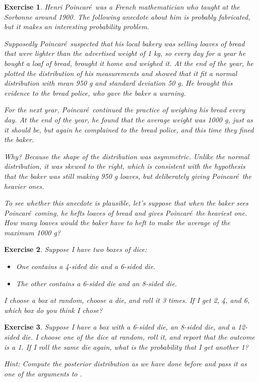 \documentclass[12pt]{book}
\theoremstyle{exercise}
\newtheorem{exercise}{Exercise}[chapter]
\begin{document}
\newcommand{\Poincare}{Poincar\'{e}}

\begin{exercise}
Henri \Poincare~was a French mathematician who taught at the Sorbonne around 1900. The following anecdote about him is probably fabricated, but it makes an interesting probability problem.

Supposedly \Poincare~suspected that his local bakery was selling loaves of bread that were lighter than the advertised weight of 1 kg, so every day for a year he bought a loaf of bread, brought it home and weighed it. At the end of the year, he plotted the distribution of his measurements and showed that it fit a normal distribution with mean 950 g and standard deviation 50 g. He brought this evidence to the bread police, who gave the baker a warning.

For the next year, \Poincare~continued the practice of weighing his bread every day. At the end of the year, he found that the average weight was 1000 g, just as it should be, but again he complained to the bread police, and this time they fined the baker.

Why? Because the shape of the distribution was asymmetric. Unlike the normal distribution, it was skewed to the right, which is consistent with the hypothesis that the baker was still making 950 g loaves, but deliberately giving \Poincare~the heavier ones.

To see whether this anecdote is plausible, let's suppose that when the baker sees \Poincare~coming, he hefts  loaves of bread and gives \Poincare~the heaviest one.  How many loaves would the baker have to heft to make the average of the maximum 1000 g?
\end{exercise}


\begin{exercise}
Suppose I have two boxes of dice:

\begin{itemize}
\item One contains a 4-sided die and a 6-sided die.

\item The other contains a 6-sided die and an 8-sided die.
\end{itemize}

I choose a box at random, choose a die, and roll it 3 times.  If I get 2, 4, and 6, which box do you think I chose?
\end{exercise}


\begin{exercise}
Suppose I have a box with a 6-sided die, an 8-sided die, and a 12-sided die.
I choose one of the dice at random, roll it, and report that the outcome is a 1.
If I roll the same die again, what is the probability that I get another 1?

Hint: Compute the posterior distribution as we have done before and pass it as one of the arguments to .
\end{exercise}
\end{document}
